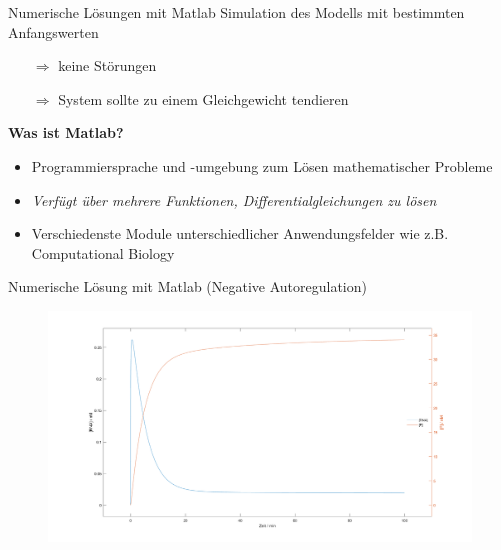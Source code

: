 \documentclass[11pt,aspectratio=169,reqno]{beamer}
\begin{document}
\begin{frame}{Numerische Lösungen mit Matlab}
    Simulation des Modells mit bestimmten Anfangswerten
    \begin{itemize}
        \item[$\Rightarrow$] keine Störungen
        \item[$\Rightarrow$] System sollte zu einem Gleichgewicht tendieren
    \end{itemize}

    \vspace{4em}
    \textbf{Was ist Matlab?}\\
    \begin{itemize}
        \item Programmiersprache und -umgebung zum Lösen mathematischer Probleme
        \item \emph{Verfügt über mehrere Funktionen, Differentialgleichungen zu lösen}
        \item Verschiedenste Module unterschiedlicher Anwendungsfelder wie z.B. Computational Biology
    \end{itemize}
\end{frame}

\begin{frame}{Numerische Lösung mit Matlab (Negative Autoregulation)}
\begin{figure}
    \centering
    \includegraphics[width=\textwidth]{images/negative_autoregulation_basic.m.png}
\end{figure}
\end{frame}
\end{document}
